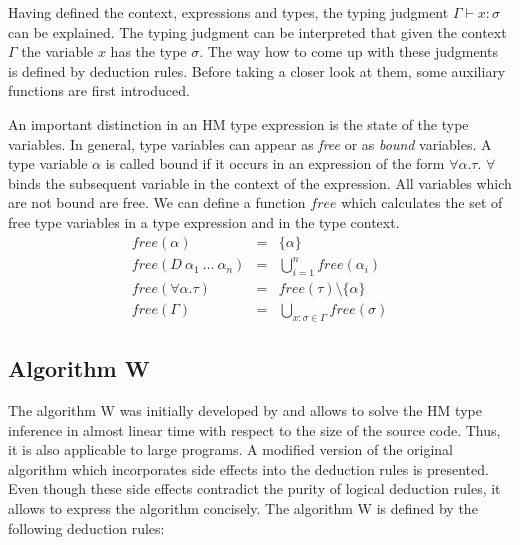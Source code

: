 Having defined the context, expressions and types, the typing judgment $\Gamma \vdash x : \sigma$ can be explained.
The typing judgment can be interpreted that given the context $\Gamma$ the variable $x$ has the type $\sigma$.
The way how to come up with these judgments is defined by deduction rules.
Before taking a closer look at them, some auxiliary functions are first introduced.

An important distinction in an HM type expression is the state of the type variables.
In general, type variables can appear as \emph{free} or as \emph{bound} variables.
A type variable $\alpha$ is called bound if it occurs in an expression of the form $\forall \alpha. \tau$.
$\forall$ binds the subsequent variable in the context of the expression.
All variables which are not bound are free.
We can define a function $free$ which calculates the set of free type variables in a type expression and in the type context.
\begin{eqnarray*}
free(\alpha) &=& \{\alpha\}\\
free(D\ \alpha_1\ \ldots\ \alpha_n) &=& \bigcup_{i=1}^n free(\alpha_i)\\
free(\forall \alpha. \tau) &=& free(\tau) \setminus \{\alpha\}\\
free(\Gamma) &=& \bigcup_{x:\sigma \in \Gamma} free(\sigma)
\end{eqnarray*}

\subsection{Algorithm W}

The algorithm W was initially developed by \textcite{damas:1982a} and allows to solve the HM type inference in almost linear time with respect to the size of the source code.
Thus, it is also applicable to large programs.
A modified version of the original algorithm which incorporates side effects into the deduction rules is presented.
Even though these side effects contradict the purity of logical deduction rules, it allows to express the algorithm concisely.
The algorithm W is defined by the following deduction rules:

\begin{prooftree}
\end{prooftree}

\begin{prooftree}
\end{prooftree}

